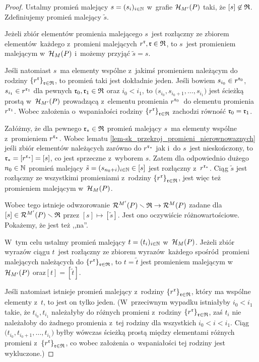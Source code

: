 \begin{proof}
Ustalmy promień malejący $s=(s_i)_{i\in\mathbb{N}}$ w~grafie $\mathcal{H}_{M'}(P)$ taki, że $[s]\not\in\mathfrak{R}$. Zdefiniujemy promień malejący $\tilde{s}$. 

Jeżeli zbiór elementów promienia malejącego $s$~jest rozłączny ze zbiorem elementów~każdego z~promieni malejących $r^{\mathfrak{r}}, \mathfrak{r}\in\mathfrak{R}$, to $s$~jest promieniem malejącym w~$\mathcal{H}_M(P)$ i~możemy przyjąć $\tilde{s}=s$. 

Jeśli natomiast $s$~ma elementy wspólne z~jakimś promieniem należącym do rodziny $\left\{r^{\mathfrak{r}}\right\}_{\mathfrak{r}\in\mathfrak{R}}$, to promień taki jest dokładnie jeden. Jeśli bowiem $s_{i_0}\in r^{\mathfrak{r}_0}$, $s_{i_1}\in r^{\mathfrak{r}_1}$ dla pewnych $\mathfrak{r}_0,\mathfrak{r}_1\in\mathfrak{R}$ oraz $i_0<i_1$, to $\bigl(s_{i_0}, s_{i_0+1},\ldots,s_{i_1}\bigr)$ jest ścieżką prostą w~$\mathcal{H}_{M'}(P)$ prowadzącą z~elementu promienia $r^{\mathfrak{r}_0}$~do elementu promienia $r^{\mathfrak{r}_1}$. Wobec założenia o~wspaniałości rodziny $\left\{r^{\mathfrak{r}}\right\}_{\mathfrak{r}\in\mathfrak{R}}$ zachodzi równość $\mathfrak{r}_0=\mathfrak{r}_1$.

Załóżmy, że dla pewnego $\mathfrak{r}_*\in\mathfrak{R}$ promień malejący $s$~ma elementy wspólne z~promieniem $r^{\mathfrak{r}_*}$. Wobec lematu \ref{lem-sk_przekroj_promieni_nierownowaznych} jeśli zbiór elementów należących zarówno do $r^{\mathfrak{r}_*}$ jak i~do $s$~jest nieskończony, to $\mathfrak{r}_*=[r^{\mathfrak{r}_*}]=[s]$, co jest sprzeczne z~wyborem $s$. Zatem dla odpowiednio dużego $n_0\in\mathbb{N}$ promień malejący $\tilde{s}=(s_{n_0+i})_{i\in\mathbb{N}}\in [s]$ jest rozłączny z~$r^{\mathfrak{r}_*}$. Ciąg $\tilde{s}$ jest rozłączny ze wszystkimi promieniami z~rodziny $\left\{r^{\mathfrak{r}}\right\}_{\mathfrak{r}\in\mathfrak{R}}$, jest więc też promieniem malejącym w~$\mathcal{H}_{M}(P)$. 

Wobec tego istnieje odwzorowanie $\mathcal{R}^{M'}(P)\smallsetminus \mathfrak{R}\to \mathcal{R}^M(P)$ zadane dla $[s]\in\mathcal{R}^{M'}(P)\smallsetminus \mathfrak{R}$ przez $[s]\mapsto [\tilde{s}]$. Jest ono oczywiście różnowartościowe. Pokażemy, że jest też ,,na''.

W~tym celu ustalmy promień malejący $t=(t_i)_{i\in\mathbb{N}}$ w~$\mathcal{H}_{M}(P)$. Jeżeli zbiór wyrazów ciągu $t$~jest rozłączny ze zbiorem wyrazów~każdego spośród~promieni malejących należących do $\left\{r^{\mathfrak{r}}\right\}_{\mathfrak{r}\in\mathfrak{R}}$, to $t=\tilde{t}$ jest promieniem malejącym w~$\mathcal{H}_{M'}(P)$ oraz$[t]=[\tilde{t}]$.

Jeśli natomiast istnieje promień malejący z~rodziny $\left\{r^{\mathfrak{r}}\right\}_{\mathfrak{r}\in\mathfrak{R}}$, który ma wspólne elementy z~$t$, to jest on tylko jeden. (W~przeciwnym wypadku istniałyby $i_0<i_1$ takie, że $t_{i_0}, t_{i_1}$ należałyby do różnych promieni z~rodziny $\left\{r^{\mathfrak{r}}\right\}_{\mathfrak{r}\in\mathfrak{R}}$, zaś $t_i$ nie należałoby do żadnego promienia z~tej rodziny dla wszystkich $i_0<i<i_1$. Ciąg $\bigl(t_{i_0},t_{i_0+1},\ldots, t_{i_1}\bigr)$ byłby wówczas ścieżką prostą między elementami różnych promieni z~$\left\{r^{\mathfrak{r}}\right\}_{\mathfrak{r}\in\mathfrak{R}}$, co wobec założenia o~wspaniałości tej rodziny jest wykluczone.)


\end{proof}
